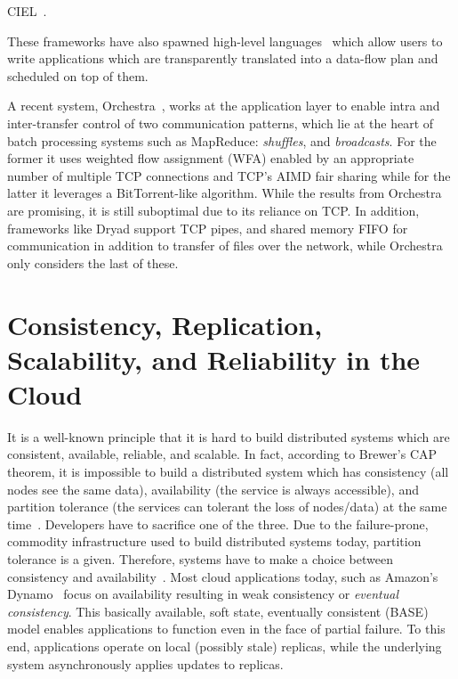 \documentclass[a4paper,12pt,twoside,openright]{report}
\begin{document}
CIEL~\cite{Murray:2011:CUE}.

These frameworks have also spawned high-level
languages~\cite{Olston:2008:PLN,Pike:2005:IDP,Murray:2010:SCS,Yu:2008:DSG} which
allow users to write applications which are transparently translated into a
data-flow plan and scheduled on top of them.

A recent system, Orchestra~\cite{Chowdhury:2011:MDT}, works at the application
layer to enable intra and inter-transfer control of two communication patterns,
which lie at the heart of batch processing systems such as MapReduce:
\emph{shuffles}, and \emph{broadcasts}. For the former it uses weighted flow
assignment (WFA) enabled by an appropriate number of multiple TCP connections
and TCP's AIMD fair sharing while for the latter it leverages a BitTorrent-like
algorithm. While the results from Orchestra are promising, it is still
suboptimal due to its reliance on TCP. In addition, frameworks like Dryad
support TCP pipes, and shared memory FIFO for communication in addition to
transfer of files over the network, while Orchestra only considers the last of
these.

\section{Consistency, Replication, Scalability, and Reliability in the
Cloud}\label{chapter:background:section:consistency}
It is a well-known principle that it is hard to build distributed systems which
are consistent, available, reliable, and scalable. In fact, according to
Brewer's CAP theorem, it is impossible to build a distributed system which has
consistency (all nodes see the same data), availability (the service is always
accessible), and partition tolerance (the services can tolerant the loss of
nodes/data) at the same time~\cite{Brewer:2000:TRD,Gilbert:2002:BCF}. Developers
have to sacrifice one of the three. Due to the failure-prone, commodity
infrastructure used to build distributed systems today, partition tolerance is a
given. Therefore, systems have to make a choice between consistency and
availability~\cite{Vogels:2009:EC}. Most cloud applications today, such as
Amazon's Dynamo~\cite{DeCandia:2007:DAH} focus on availability resulting in weak
consistency or \emph{eventual consistency}. This basically available, soft
state, eventually consistent (BASE)~\cite{Pritchett:2008:BAA} model enables
applications to function even in the face of partial failure. To this end,
applications operate on local (possibly stale) replicas, while the underlying
system asynchronously applies updates to replicas.
\end{document}
